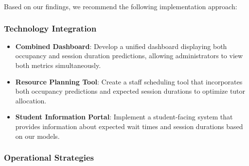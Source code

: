 \documentclass[12pt,letterpaper]{article}
\begin{document}
Based on our findings, we recommend the following implementation approach:

\subsubsection{Technology Integration}

\begin{itemize}
    \item \textbf{Combined Dashboard}: Develop a unified dashboard displaying both occupancy and session duration predictions, allowing administrators to view both metrics simultaneously.
    
    \item \textbf{Resource Planning Tool}: Create a staff scheduling tool that incorporates both occupancy predictions and expected session durations to optimize tutor allocation.
    
    \item \textbf{Student Information Portal}: Implement a student-facing system that provides information about expected wait times and session durations based on our models.
\end{itemize}

\subsubsection{Operational Strategies}
\end{document}
